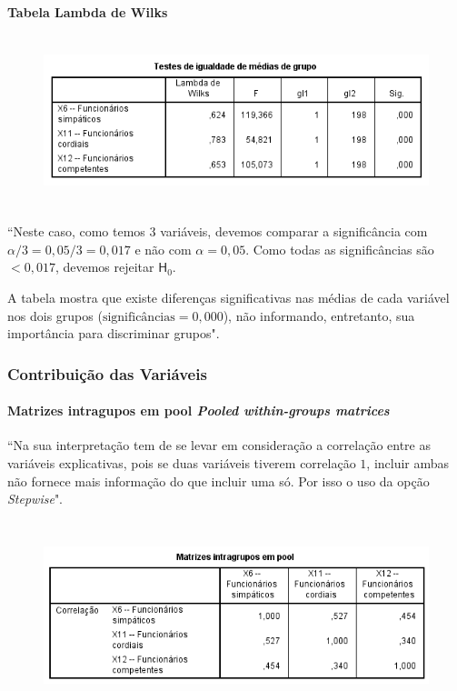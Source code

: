 			\bigskip \bigskip

			\textbf{Tabela Lambda de Wilks}

				\begin{figure}[H]
					\centering
					\includegraphics[height=5cm]{images/analise-discriminante_lambda-de-wilks}
				\end{figure}

				``Neste caso, como temos 3 variáveis, devemos comparar a significância com $\alpha / 3 = 0,05/3 = 0,017 $ e não com $\alpha = 0,05$. Como todas as significâncias são $< 0,017$, devemos rejeitar $\mathsf{H}_{0}$.

				A tabela mostra que existe diferenças significativas nas médias de cada variável nos dois grupos ($\text{significâncias} = 0,000$), não informando, entretanto, sua importância para discriminar grupos".

		\subsubsection{Contribuição das Variáveis}

			\paragraph{Matrizes intragupos em pool \textit{Pooled within-groups matrices}} \hspace{0cm}

				``Na sua interpretação tem de se levar em consideração a correlação entre as variáveis explicativas, pois se duas variáveis tiverem correlação $1$, incluir ambas não fornece mais informação do que incluir uma só. Por isso o uso da opção \textit{Stepwise}".

				\begin{figure}[H]
					\centering
					\includegraphics[height=5.5cm]{images/analise-discriminante_matrizes-intragupos-em-pool}
				\end{figure}

